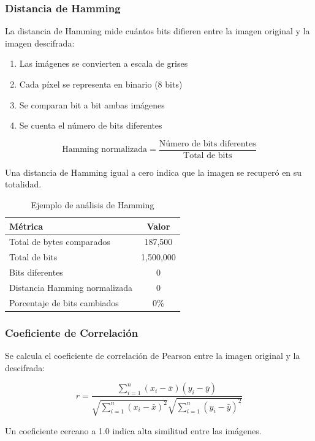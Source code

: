 \documentclass[12pt,a4paper]{article}
\begin{document}
	\subsubsection{Distancia de Hamming}
	
	La distancia de Hamming mide cuántos bits difieren entre la imagen original y la imagen descifrada:
	
	\begin{enumerate}
		\item Las imágenes se convierten a escala de grises
		\item Cada píxel se representa en binario (8 bits)
		\item Se comparan bit a bit ambas imágenes
		\item Se cuenta el número de bits diferentes
	\end{enumerate}
	
	$$\text{Hamming normalizada} = \frac{\text{Número de bits diferentes}}{\text{Total de bits}}$$
	
	Una distancia de Hamming igual a cero indica que la imagen se recuperó en su totalidad.
	
	\begin{table}[H]
		\centering
		\caption{Ejemplo de análisis de Hamming}
		\label{tab:hamming}
		\begin{tabular}{@{}lc@{}}
			\toprule
			\textbf{Métrica} & \textbf{Valor} \\ \midrule
			Total de bytes comparados & 187,500 \\
			Total de bits & 1,500,000 \\
			Bits diferentes & 0 \\
			Distancia Hamming normalizada & 0 \\
			Porcentaje de bits cambiados & 0\% \\ \bottomrule
		\end{tabular}
	\end{table}
	
	\subsubsection{Coeficiente de Correlación}
	
	Se calcula el coeficiente de correlación de Pearson entre la imagen original y la descifrada:
	
	$$r = \frac{\sum_{i=1}^{n}(x_i - \bar{x})(y_i - \bar{y})}{\sqrt{\sum_{i=1}^{n}(x_i - \bar{x})^2}\sqrt{\sum_{i=1}^{n}(y_i - \bar{y})^2}}$$
	
	Un coeficiente cercano a 1.0 indica alta similitud entre las imágenes.
	
\end{document}

